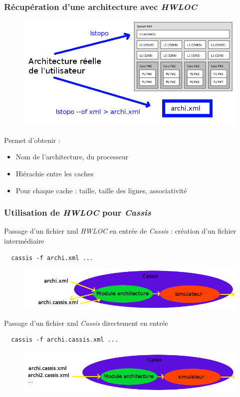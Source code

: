 \begin{frame}
  \frametitle{Récupération d'une architecture avec \emph{HWLOC}}
  \begin{figure}[t!]
    \includegraphics[width=.6\textwidth]{images/hwlocschema.png}
  \end{figure}

  Permet d'obtenir :
  \begin{itemize}
  \item Nom de l'architecture, du processeur
  \item Hiérachie entre les caches
  \item Pour chaque cache : taille, taille des lignes, associativité
  \end{itemize}

\end{frame}


\begin{frame}[fragile]
  \frametitle{Utilisation de \emph{HWLOC} pour \emph{Cassis}}

  Passage d'un fichier xml \emph{HWLOC} en entrée de \emph{Cassis} : création d'un fichier intermédiaire \\
\begin{verbatim}
  cassis -f archi.xml ...
\end{verbatim}

\begin{figure}[h!]
  \includegraphics[width=.6\textwidth]{images/archicassis1.png}
\end{figure}

Passage d'un fichier xml \emph{Cassis} directement en entrée \\
\begin{verbatim}
  cassis -f archi.cassis.xml ...
\end{verbatim}

\begin{figure}[t!]
  \includegraphics[width=.6\textwidth]{images/archicassis2.png}
\end{figure}
\end{frame}


